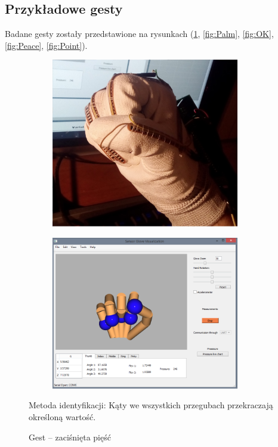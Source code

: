 \documentclass[12pt,a4paper]{article}
\begin{document}
\subsection{Przykładowe gesty}
Badane gesty zostały przedstawione na rysunkach (\ref{fig:Fist}, \ref{fig:Palm}, \ref{fig:OK}, \ref{fig:Peace}, \ref{fig:Point}).\\
\begin{figure}[!htb]
\centering
    \begin{subfigure}{.5\textwidth}
    \centering
      \includegraphics[width=0.9\textwidth]{./images/Fist.jpg}
     \end{subfigure}%
    \begin{subfigure}{.5\textwidth}
    \centering
      \includegraphics[width=0.9\textwidth]{./images/FistQt.png}
     \end{subfigure}
    \caption{Gest -- zaciśnięta pięść \label{fig:Fist}}
\flushleft Metoda identyfikacji: Kąty we wszystkich przegubach przekraczają określoną wartość.
\end{figure}
\end{document}
